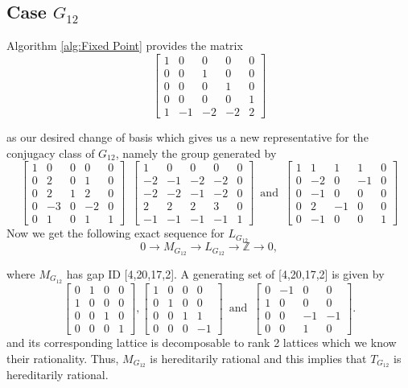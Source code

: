 \documentclass{article}
\theoremstyle{plain}
\theoremstyle{definition}
\newcommand{\Z}{\ensuremath{\mathbb{Z}}}
\newcommand{\tand}{\ensuremath{\,\,\, \text{and} \,\,\,}}
\newcommand{\exactseq}[1]{\ensuremath{0 \longrightarrow M_{#1} \longrightarrow L_{#1} \longrightarrow \Z \longrightarrow 0}}
\begin{document}
\subsection{Case $G_{12}$}

Algorithm \ref{alg:Fixed Point} provides the matrix 
$$
 \left[ \begin {array}{ccccc} 1&0&0&0&0\\ 0&0&1&0&0
\\ 0&0&0&1&0\\ 0&0&0&0&1
\\ 1&-1&-2&-2&2\end {array} \right]
$$

as our desired change of basis which gives us a new representative for the conjugacy class of $G_{12}$, namely the group generated by
$$
\left[ \begin {array}{cccc|c} 1&0&0&0&0\\  0&2&0&1&0
\\  0&2&1&2&0\\  0&-3&0&-2&0
\\ \hline 0&1&0&1&1\end {array} \right] 
\,\,\,
 \left[ \begin {array}{cccc|c} 1&0&0&0&0\\  -2&-1&-2&-
2&0\\  -2&-2&-1&-2&0\\  2&2&2&3&0
\\ \hline -1&-1&-1&-1&1\end {array} \right] 
\tand
 \left[ \begin {array}{cccc|c} 1&1&1&1&0\\  0&-2&0&-1&0
\\  0&-1&0&0&0\\  0&2&-1&0&0
\\ \hline 0&-1&0&0&1\end {array} \right]
$$
Now we get the following exact sequence for $L_{G_{12}}$
$$
\exactseq{G_{12}},
$$

where $M_{G_{12}}$ has gap ID [4,20,17,2]. A generating set of [4,20,17,2] is given by  
$$
\left[ \begin {array}{cccc} 0&1&0&0\\ 1&0&0&0
\\ 0&0&1&0\\ 0&0&0&1\end {array}
 \right] ,
 \left[ \begin {array}{cccc} 1&0&0&0\\ 0&1&0&0
\\ 0&0&1&1\\ 0&0&0&-1\end {array}
 \right] 
 \tand
 \left[ \begin {array}{cccc} 0&-1&0&0\\ 1&0&0&0
\\ 0&0&-1&-1\\ 0&0&1&0\end {array}
 \right].
$$
and its corresponding lattice is decomposable to rank 2 lattices which we know their rationality. Thus, $M_{G_{12}}$ is hereditarily rational and this implies that $T_{G_{12}}$ is hereditarily rational.
\bigskip
\end{document}
